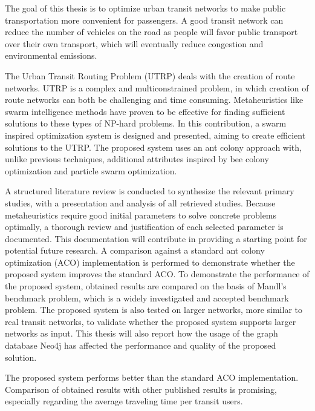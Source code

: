 

The goal of this thesis is to optimize urban transit networks to make public transportation more convenient for passengers. A good transit network can reduce the number of vehicles on the road as people will favor public transport over their own transport, which will eventually reduce congestion and environmental emissions.

The Urban Transit Routing Problem (UTRP) deals with the creation of route networks.  UTRP is a complex and multiconstrained problem, in which creation of route networks can both be challenging and time consuming. Metaheuristics like swarm intelligence methods have proven to be effective for finding sufficient solutions to these types of NP-hard problems. In this contribution, a swarm inspired optimization system is designed and presented, aiming to create efficient solutions to the UTRP. The proposed system uses an ant colony approach with, unlike previous techniques, additional attributes inspired by bee colony optimization and particle swarm optimization. 

A structured literature review is conducted to synthesize the relevant primary studies, with a presentation and analysis of all retrieved studies.  Because metaheuristics require good initial parameters to solve concrete problems optimally, a thorough review and justification of each selected parameter is documented. This documentation will contribute in providing a starting point for potential future research. A comparison against a standard ant colony optimization (ACO) implementation is performed to demonstrate whether the proposed system improves the standard ACO. To demonstrate the performance of the proposed system, obtained results are compared on the basis of Mandl's benchmark problem, which is a widely investigated and accepted benchmark problem. The proposed system is also tested on larger networks, more similar to real transit networks, to validate whether the proposed system supports larger networks as input. This thesis will also report how the usage of the graph database Neo4j has affected the performance and quality of the proposed solution. 

The proposed system performs better than the standard ACO implementation. Comparison of obtained results with other published results is promising, especially regarding the average traveling time per transit users. 



